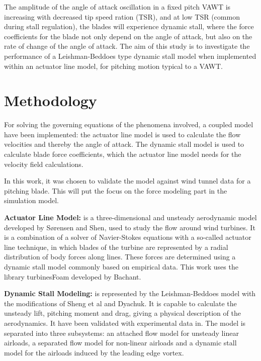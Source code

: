 \documentclass[a4paper]{jpconf}
\begin{document}
The amplitude of the angle of attack oscillation in a fixed pitch VAWT is increasing
with decreased tip speed
ration (TSR), and at low TSR (common during stall regulation), the blades will
experience dynamic stall, where the force coefficients for the blade not only
depend on the angle of attack, but also on the rate of change of the angle of
attack. The aim of this study is to investigate the performance of a
Leishman-Beddoes type dynamic stall model when implemented within an actuator
line model, for pitching motion typical to a VAWT.


\section{Methodology}

For solving the governing equations of the phenomena involved, a coupled model have
been implemented: the actuator line model is used to calculate the flow
velocities and thereby the angle of attack. The dynamic stall model is used to
calculate blade force coefficients, which the actuator line model needs for the
velocity field calculations.

In this work, it was chosen to validate the model
against wind tunnel data for a pitching blade. This will put the focus on the
force modeling part in the simulation model.

\textbf{Actuator Line Model:} is a three-dimensional and unsteady aerodynamic
model developed by S{\o}rensen and Shen\cite{sorensen1999computation}, used to
study the flow around wind turbines. It is a combination of a solver of
Navier-Stokes equations with a so-called actuator line technique, in which
blades of the turbine are represented by a radial distribution of body forces
along lines. These forces are determined using a dynamic stall model commonly
based on empirical data. This work uses the library turbinesFoam developed by
Bachant\cite{bachant2015simulating}.

\textbf{Dynamic Stall Modeling:} is represented by the Leishman-Beddoes
model\cite{leishman1986generalised} with the modifications of Sheng et
al\cite{sheng2008modified} and Dyachuk\cite{dyachuk}.
It is capable to calculate the unsteady lift,
pitching moment and drag, giving a physical description of the aerodynamics. It
have been validated with experimental data in\cite{leishman1989semi}.
The model is separated into three subsystems: an attached flow model for unsteady linear
airloads, a separated flow model for non-linear airloads and a dynamic stall
model for the airloads induced by the leading edge vortex.
\end{document}
